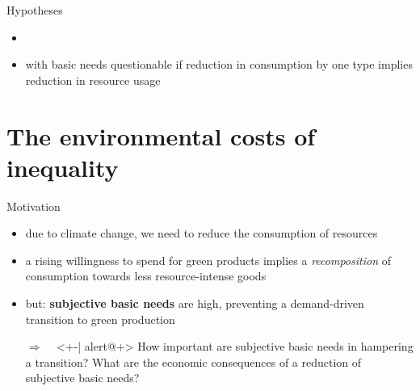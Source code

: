 \documentclass[11pt,aspectratio=169]{beamer}
\newcommand{\ar}{$\Rightarrow$ \ }
\begin{document}
\begin{frame}{Hypotheses}
	
\begin{itemize}
	\item 
		\item with basic needs questionable if reduction in consumption by one type implies reduction in resource usage 
\end{itemize}
\end{frame}

\section{The environmental costs of inequality}

\begin{frame}{Motivation}
	
	\begin{itemize}[<+-| alert@+>]
		
		\item<+-| alert@+> due to climate change, we need to reduce the consumption of resources
		\vspace{4mm}
		\item<+-| alert@+> a rising willingness to spend for green products implies a \textit{recomposition} of consumption towards less resource-intense goods
		\vspace{4mm}
		\item<+-| alert@+>  but: \textbf{\textcolor{cyan!100}{subjective basic needs}} are high, preventing a demand-driven transition to green production
		\vspace{4mm}
		\item[\ar]<+-| alert@+> How important are subjective basic needs in hampering a transition?  What are the economic consequences of a reduction of subjective basic needs?
	\end{itemize}
\end{frame}
\end{document}
